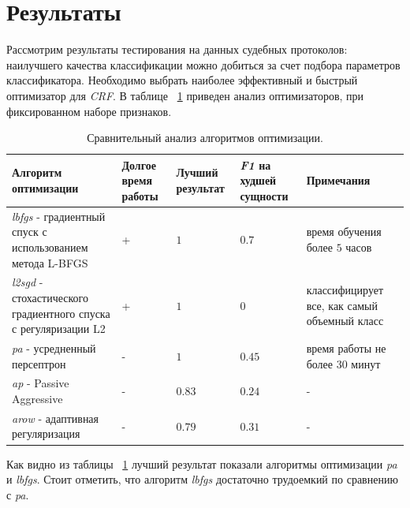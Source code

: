 \documentclass{csmathnotes}
\begin{document}
\section*{Результаты}
Рассмотрим результаты тестирования на данных судебных протоколов: наилучшего качества классификации можно добиться за счет подбора параметров классификатора. Необходимо выбрать наиболее эффективный и быстрый оптимизатор для \emph{CRF}. В таблице ~\ref{tabl:table1} приведен анализ оптимизаторов, при фиксированном наборе признаков.
\begin{table}[!h]
    \begin{center}
        \begin{tabular}{|p{3cm}|p{1.3cm}|p{1.5cm}|p{1.5cm}|p{2.5cm}|}
            \hline
            Алгоритм оптимизации &  Долгое время работы & Лучший результат & \emph{F1} на худшей сущности & Примечания \\
            \hline
            \emph{lbfgs} - градиентный спуск с использованием метода 
            L-BFGS & + & $1$ & $0.7$ & время обучения более $5$ часов  \\
            \hline
            \emph{l2sgd} - стохастического  градиентного спуска  с регуляризации L2 & + & $1$  & $0$ & классифицирует все, как самый объемный класс \\
            \hline
            \emph{pa} - усредненный персептрон & - & $1$  & $0.45$ & время работы не более $30$ минут \\
            \hline
            \emph{ap} - Passive Aggressive & - & $0.83$ & $0.24$  & - \\
            \hline
            \emph{arow} - адаптивная регуляризация  & - & $0.79$ & $0.31$  & - \\
            \hline
        \end{tabular}
    \end{center}
    \caption{\label{tabl:table1}Сравнительный анализ алгоритмов оптимизации.}
\end{table}

Как видно из таблицы ~\ref{tabl:table1} лучший результат показали алгоритмы оптимизации \emph{pa} и \emph{lbfgs}. Стоит отметить, что алгоритм \emph{lbfgs}  достаточно трудоемкий по сравнению с \emph{pa}.
\end{document}
